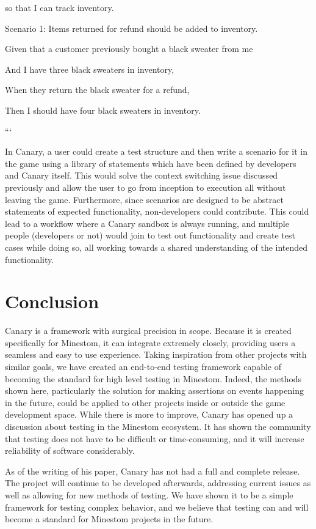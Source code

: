 \documentclass{article}
\begin{document}
\begin{onehalfspacing}
so that I can track inventory.

Scenario 1: Items returned for refund should be added to inventory.

Given that a customer previously bought a black sweater from me

And I have three black sweaters in inventory,

When they return the black sweater for a refund,

Then I should have four black sweaters in inventory.

```

In Canary, a user could create a test structure and then write a
scenario for it in the game using a library of statements which have
been defined by developers and Canary itself. This would solve the
context switching issue discussed previously and allow the user to go
from inception to execution all without leaving the game. Furthermore,
since scenarios are designed to be abstract statements of expected
functionality, non-developers could contribute. This could lead to a
workflow where a Canary sandbox is always running, and multiple people
(developers or not) would join to test out functionality and create test
cases while doing so, all working towards a shared understanding of the
intended functionality.

\section{Conclusion}

Canary is a framework with surgical precision in scope. Because it is
created specifically for Minestom, it can integrate extremely closely,
providing users a seamless and easy to use experience. Taking
inspiration from other projects with similar goals, we have created an
end-to-end testing framework capable of becoming the standard for high
level testing in Minestom. Indeed, the methods shown here, particularly
the solution for making assertions on events happening in the future,
could be applied to other projects inside or outside the game
development space. While there is more to improve, Canary has opened up
a discussion about testing in the Minestom ecosystem. It has shown the
community that testing does not have to be difficult or time-consuming,
and it will increase reliability of software considerably.

As of the writing of his paper, Canary has not had a full and complete
release. The project will continue to be developed afterwards,
addressing current issues as well as allowing for new methods of
testing. We have shown it to be a simple framework for testing complex
behavior, and we believe that testing can and will become a standard for
Minestom projects in the future.

\end{onehalfspacing} %
\end{document}
